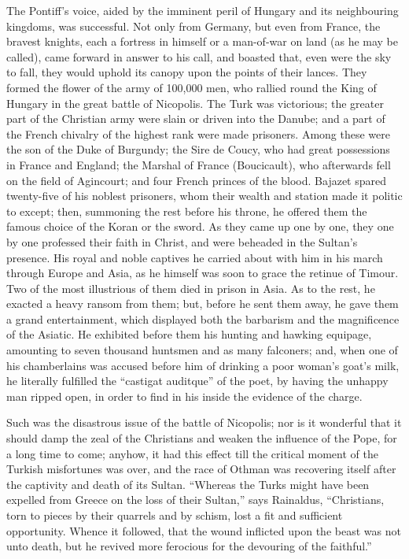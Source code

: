 The Pontiff's voice, aided by
the imminent peril of Hungary and its neighbouring kingdoms, was
successful. Not only from Germany, but even from France, the bravest
knights, each a fortress in himself or a man-of-war on land (as he may
be called), came forward in answer to his call, and boasted that, even
were the sky to fall, they would uphold its canopy upon the points of
their lances. They formed the flower of the army of 100,000 men, who
rallied round the King of Hungary in the great battle of Nicopolis.
The Turk was victorious; the greater part of the Christian army were
slain or driven into the Danube; and a part of the French chivalry of
the highest rank were made prisoners. Among these were the son of the
Duke of Burgundy; the Sire de Coucy, who had great possessions in
France and England; the Marshal of France (Boucicault), who afterwards
fell on the field of Agincourt; and four French princes of the blood.
Bajazet spared twenty-five of his noblest prisoners, whom their wealth
and station made it politic to except; then, summoning the rest before
his throne, he offered them the famous choice of the Koran or the
sword. As they came up one by one, they one by one professed their
faith in Christ, and were beheaded in the Sultan's presence. His royal
and noble captives he carried about with him in his march through
Europe and Asia, as he himself was soon to grace the retinue of Timour.
Two of the most illustrious of them died in prison in Asia. As to the
rest, he exacted a heavy ransom from them; but, before he sent them
away, he gave them a grand entertainment, which displayed both the
barbarism and the magnificence of the Asiatic. He exhibited
before them his hunting and hawking equipage, amounting to seven
thousand huntsmen and as many falconers; and, when one of his
chamberlains was accused before him of drinking a poor woman's goat's
milk, he literally fulfilled the ``castigat auditque'' of the poet, by
having the unhappy man ripped open, in order to find in his inside the
evidence of the charge.

Such was the disastrous issue
of the battle of Nicopolis; nor is it wonderful that it should damp
the zeal of the Christians and weaken the influence of the Pope, for a
long time to come; anyhow, it had this effect till the critical moment
of the Turkish misfortunes was over, and the race of Othman was
recovering itself after the captivity and death of its Sultan. ``Whereas
the Turks might have been expelled from Greece on the loss of their
Sultan,'' says Rainaldus, ``Christians, torn to pieces by their quarrels
and by schism, lost a fit and sufficient opportunity. Whence it
followed, that the wound inflicted upon the beast was not unto death,
but he revived more ferocious for the devouring of the faithful.''

